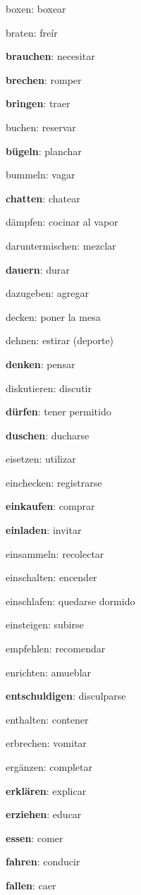 \begin{multicols}{2}
\begin{myitemize}
\item boxen: boxear
\item braten: freír
\item \textbf{brauchen}: necesitar
\item \textbf{brechen}: romper
\item \textbf{bringen}: traer
\item buchen: reservar
\item \textbf{bügeln}: planchar
\item bummeln: vagar
\item \textbf{chatten}: chatear
\item dämpfen: cocinar al vapor
\item daruntermischen: mezclar
\item \textbf{dauern}: durar
\item dazugeben: agregar
\item decken: poner la mesa
\item dehnen: estirar (deporte)
\item \textbf{denken}: pensar
\item diskutieren: discutir
\item \textbf{dürfen}: tener permitido
\item \textbf{duschen}: ducharse
\item eisetzen: utilizar
\item einchecken: registrarse
\item \textbf{einkaufen}: comprar
\item \textbf{einladen}: invitar
\item einsammeln: recolectar
\item einschalten: encender
\item einschlafen: quedarse dormido
\item einsteigen: subirse
\item empfehlen: recomendar
\item enrichten: amueblar
\item \textbf{entschuldigen}: disculparse
\item enthalten: contener
\item erbrechen: vomitar
\item ergänzen: completar
\item \textbf{erklären}: explicar
\item \textbf{erziehen}: educar
\item \textbf{essen}: comer
\item \textbf{fahren}: conducir
\item \textbf{fallen}: caer

\end{myitemize}
\end{multicols}
